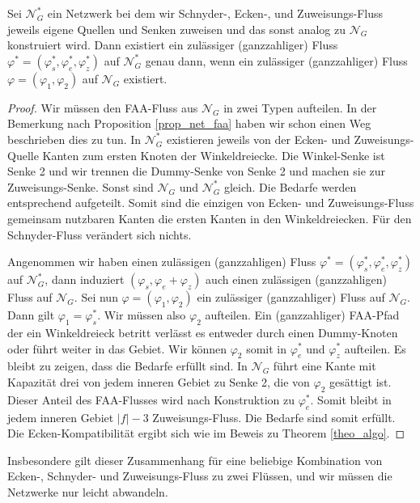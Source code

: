 \begin{proposition}
Sei $\mathcal{N}^*_G$ ein Netzwerk bei dem wir Schnyder-, Ecken-, und Zuweisungs-Fluss jeweils eigene Quellen und Senken zuweisen und das sonst analog zu $\mathcal{N}_G$ konstruiert wird. Dann existiert ein zulässiger (ganzzahliger) Fluss $\varphi^*=(\varphi^*_s,\varphi^*_e,\varphi^*_z)$ auf $\mathcal{N}^*_G$ genau dann, wenn ein zulässiger (ganzzahliger) Fluss $\varphi=(\varphi_1,\varphi_2)$ auf 
$\mathcal{N}_G$ existiert.
\end{proposition}

\begin{proof}
Wir müssen den FAA-Fluss aus $\mathcal{N}_G$ in zwei Typen aufteilen. In der Bemerkung nach Proposition \ref{prop_net_faa} haben wir schon einen Weg beschrieben dies zu tun. In $\mathcal{N}_G^*$ existieren jeweils von der Ecken- und Zuweisungs-Quelle Kanten zum ersten Knoten der Winkeldreiecke. Die Winkel-Senke ist Senke 2 und wir trennen die Dummy-Senke von Senke 2 und machen sie zur Zuweisungs-Senke. Sonst sind $\mathcal{N}_G$ und $\mathcal{N}^*_G$ gleich. Die Bedarfe werden entsprechend aufgeteilt. Somit sind die einzigen von Ecken- und Zuweisungs-Fluss gemeinsam nutzbaren Kanten die ersten Kanten in den Winkeldreiecken. Für den Schnyder-Fluss verändert sich nichts.

Angenommen wir haben einen zulässigen (ganzzahligen) Fluss $\varphi^*=(\varphi^*_s,\varphi^*_e,\varphi^*_z)$ auf $\mathcal{N}_G^*$, dann induziert $(\varphi_s,\varphi_e+\varphi_z)$ auch einen zulässigen (ganzzahligen) Fluss auf $\mathcal{N}_G$. Sei nun $\varphi=(\varphi_1,\varphi_2)$ ein zulässiger (ganzzahliger) Fluss auf $\mathcal{N}_G$. Dann gilt $\varphi_1 = \varphi^*_s$. Wir müssen also $\varphi_2$ aufteilen. Ein (ganzzahliger) FAA-Pfad der ein Winkeldreieck betritt verlässt es entweder durch einen Dummy-Knoten oder führt weiter in das Gebiet. Wir können $\varphi_2$ somit in $\varphi_e^*$ und $\varphi_z^*$ aufteilen. Es bleibt zu zeigen, dass die Bedarfe erfüllt sind. In $\mathcal{N}_G$ führt eine Kante mit Kapazität drei von jedem inneren Gebiet zu Senke 2, die von $\varphi_2$ gesättigt ist. Dieser Anteil des FAA-Flusses wird nach Konstruktion zu $\varphi_e^*$. Somit bleibt in jedem inneren Gebiet $|f|-3$ Zuweisungs-Fluss. Die Bedarfe sind somit erfüllt. Die Ecken-Kompatibilität ergibt sich wie im Beweis zu Theorem \ref{theo_algo}.
\end{proof}

Insbesondere gilt dieser Zusammenhang für eine beliebige Kombination von Ecken-, Schnyder- und Zuweisungs-Fluss zu zwei Flüssen, und wir müssen die Netzwerke nur leicht abwandeln.

